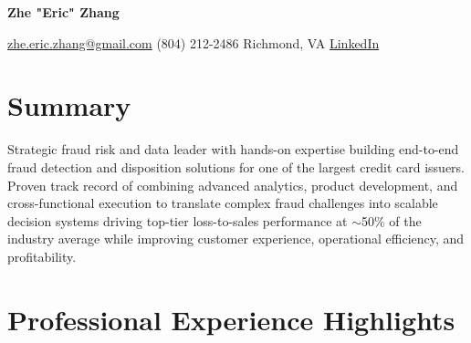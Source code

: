 \documentclass[letterpaper,10pt]{article}
\makeatletter
\newcommand{\Name}{Zhe "Eric" Zhang}
\newcommand{\CityState}{Richmond, VA}
\newcommand{\Phone}{(804) 212-2486}
\newcommand{\Email}{zhe.eric.zhang@gmail.com}
\newcommand{\LinkedIn}{https://www.linkedin.com/in/ericzhang7}
\newcommand{\makeHeader}{
    \begin{center}
        {\Large \textbf{\Name}}\par
        \vspace{3pt}
        \small
        \href{mailto:\Email}{\Email} \enspace\textbullet\enspace 
		\Phone{} \enspace\textbullet\enspace
		\CityState{} \enspace\textbullet\enspace
        \href{https://\LinkedIn}{LinkedIn} \enspace
    \end{center}
    \vspace{-10pt}
}
\makeatother
\begin{document}
\pagestyle{empty}
\makeHeader

\section{Summary}
Strategic fraud risk and data leader with hands-on expertise building end-to-end fraud detection and disposition solutions for one of the largest credit card issuers. Proven track record of combining advanced analytics, product development, and cross-functional execution to translate complex fraud challenges into scalable decision systems driving top-tier loss-to-sales performance at $\sim$50\% of the industry average while improving customer experience, operational efficiency, and profitability.

\section{Professional Experience Highlights}
\end{document}
